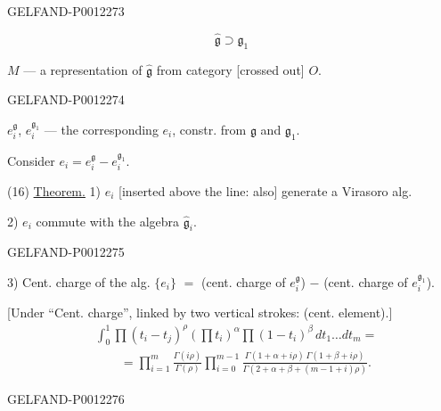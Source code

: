 \begin{GelfandAdjacentEvidence}{GELFAND-P001227}{3}

\begin{equation*}
\widehat{\mathfrak g}\supset\widehat{\mathfrak g}_1
\end{equation*}

\(M\) --- a representation of \(\widehat{\mathfrak g}\) from category [crossed out] \(O\).
\end{GelfandAdjacentEvidence}
\begin{GelfandAdjacentEvidence}{GELFAND-P001227}{4}


\(e_i^{\mathfrak g}\), \(e_i^{\mathfrak g_1}\) --- the corresponding \(e_i\),
constr. from \(\mathfrak g\) and \(\mathfrak g_1\).

Consider \(e_i=e_i^{\mathfrak g}-e_i^{\mathfrak g_1}\).

(16) \underline{Theorem.} 1) \(e_i\) [inserted above the line: also] generate a Virasoro alg.

2) \(e_i\) commute with the algebra \(\widehat{\mathfrak g}_i\).
\end{GelfandAdjacentEvidence}
\begin{GelfandAdjacentEvidence}{GELFAND-P001227}{5}


3) Cent. charge of the alg. \(\{e_i\}\) \(=\)
(cent. charge of \(e_i^{\mathfrak g}\)) \(-\) (cent. charge of \(e_i^{\mathfrak g_1}\)).

[Under “Cent. charge”, linked by two vertical strokes: (cent. element).]
\begin{equation*}
\begin{aligned}
&\int_0^1\prod(t_i-t_j)^\rho
\left(\prod t_i\right)^\alpha\prod(1-t_i)^\beta\,dt_1\ldots dt_m=\\
&\qquad=\prod_{i=1}^{m}\frac{\Gamma(i\rho)}{\Gamma(\rho)}
\prod_{i=0}^{m-1}\frac{\Gamma(1+\alpha+i\rho)\,\Gamma(1+\beta+i\rho)}
{\Gamma(2+\alpha+\beta+(m-1+i)\rho)}.
\end{aligned}\tag{17}
\end{equation*}
\end{GelfandAdjacentEvidence}
\begin{GelfandAdjacentEvidence}{GELFAND-P001227}{6}

\end{GelfandAdjacentEvidence}


